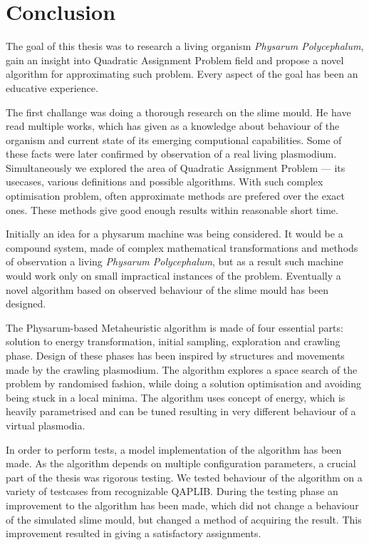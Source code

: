 \chapter{Conclusion}
\label{chapter:conclusion}

The goal of this thesis was to research a living organism \textit{Physarum Polycephalum}, gain an insight into Quadratic Assignment Problem field and propose a novel algorithm for approximating such problem. Every aspect of the goal has been an educative experience.

The first challange was doing a thorough research on the slime mould. He have read multiple works, which has given as a knowledge about behaviour of the organism and current state of its emerging computional capabilities. Some of these facts were later confirmed by observation of a real living plasmodium. Simultaneously we explored the area of Quadratic Assignment Problem --- its usecases, various definitions and possible algorithms. With such complex optimisation problem, often approximate methods are prefered over the exact ones. These methods give good enough results within reasonable short time.

Initially an idea for a physarum machine was being considered. It would be a compound system, made of complex mathematical transformations and methods of observation a living \textit{Physarum Polycephalum}, but as a result such machine would work only on small impractical instances of the problem. Eventually a novel algorithm based on observed behaviour of the slime mould has been designed. 

The Physarum-based Metaheuristic algorithm is made of four essential parts: solution to energy transformation, initial sampling, exploration and crawling phase. Design of these phases has been inspired by structures and movements made by the crawling plasmodium. The algorithm explores a space search of the problem by randomised fashion, while doing a solution optimisation and avoiding being stuck in a local minima. The algorithm uses concept of energy, which is heavily parametrised and can be tuned resulting in very different behaviour of a virtual plasmodia.

In order to perform tests, a model implementation of the algorithm has been made. As the algorithm depends on multiple configuration parameters, a crucial part of the thesis was rigorous testing. We tested behaviour of the algorithm on a variety of testcases from recognizable QAPLIB. During the testing phase an improvement to the algorithm has been made, which did not change a behaviour of the simulated slime mould, but changed a method of acquiring the result. This improvement resulted in giving a satisfactory assignments.

